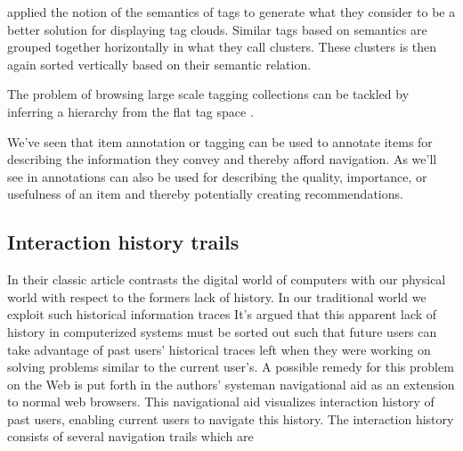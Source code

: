 \citet[]{hassan06} applied the notion of the semantics of tags to
generate what they consider to be a better solution for displaying tag clouds.
Similar tags based on semantics are grouped together horizontally in what they
call clusters. These clusters is then again sorted vertically based on their
semantic relation.

The problem of browsing large scale tagging collections can be tackled by
inferring a hierarchy%
from the flat tag space \citep[]{li07}.

\parabreak

We've seen that item annotation or tagging can be used to annotate items for
describing the information they convey and
thereby afford navigation. As we'll see in
annotations can also be used for describing the quality, importance, or
usefulness of an item and thereby potentially creating recommendations.

\subsection{Interaction history trails}
\label{section:social.navigation.applied.forms.interaction.history}

In their classic article \citet{wexelblat99} contrasts the digital world of
computers with our physical world with respect to the formers lack of history.
In our traditional world we exploit such historical information traces
It's argued that this apparent lack of history in computerized systems must
be sorted out such that future users can take advantage
of past users' historical traces left when they were working
on solving problems similar to the current user's.
A possible remedy for this problem on the Web is put forth in the authors'
 system\dash{}an navigational aid as an extension to
normal web browsers. This navigational aid visualizes interaction history of
past users, enabling current users to navigate this history.
The interaction history consists of several navigation trails which are

